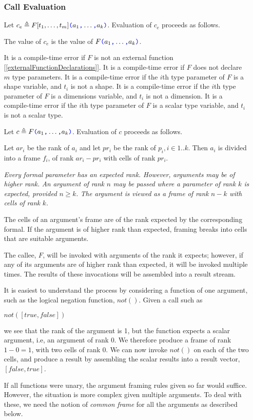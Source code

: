 \documentclass{article}
\begin{document}
\subsubsection{Call Evaluation}
\label{callEvaluation}

Let $c_e \triangleq F[t_1, \ldots, t_m]\texttt{\color{blue} (}{}a_1\texttt{\color{blue} ,}{} \ldots\texttt{\color{blue} ,}{} a_k\texttt{\color{blue} )}$. Evaluation of $c_e$ proceeds as follows. 

The value of $c_e$ is the value of $F\texttt{\color{blue} (}{}a_1\texttt{\color{blue} ,}{} \ldots\texttt{\color{blue} ,}{} a_k\texttt{\color{blue} )}$.

It is a compile-time error if $F$ is not an external function [\ref{externalFunctionDeclarations}].
It is a compile-time error if $F$ does not declare $m$ type parameters. 
It is a compile-time error if the $i$th type parameter of $F$ is a shape variable, and $t_i$ is not a shape.
It is a compile-time error if the $i$th type parameter of $F$ is a dimensions variable, and $t_i$ is not a dimension.
It is a compile-time error if the $i$th type parameter of $F$ is a scalar type variable, and $t_i$ is not a scalar type.


Let $c \triangleq F\texttt{\color{blue} (}{}a_1\texttt{\color{blue} ,}{} \ldots\texttt{\color{blue} ,}{} a_k\texttt{\color{blue} )}$. Evaluation of $c$ proceeds as follows. 

Let $ar_i$ be the rank of $a_i$ and let $pr_i$ be the rank of $p_i, i \in 1.. k$. Then  $a_i$ is divided into a frame $f_i$, of rank $ar_i - pr_i$ with cells of rank $pr_i$. 

{\em
Every formal parameter has an expected rank. However, arguments may be of higher rank. An argument of rank $n$ may be passed where a parameter of rank $k$ is expected, provided $n \ge k$. The argument is viewed as a frame of rank $n-k$ with cells of rank $k$. 

The cells of an argument's frame are of the rank expected by the corresponding formal. If the argument is of higher rank than expected, framing breaks into cells that are suitable 
arguments.

The callee, $F$, will be invoked with arguments of the rank it expects; however, if any of its arguments are of higher rank than expected, it will be invoked multiple times.
The results of these invocations will be assembled into a result stream. 

It is easiest to understand the process by considering a function of one argument, such as the logical negation function, $not()$. Given a call such as

$not([true, false])$

we see that the rank of the argument is 1, but the function expects a scalar argument, i.e, an argument of rank 0. We therefore produce a frame of rank $1 - 0 = 1$, with two cells of rank $0$.  We can now invoke $not()$ on each of the two cells, and produce a result by assembling the scalar results into a result vector, $[false, true]$.

If all functions were unary, the argument framing rules given so far would suffice. However, the situation is more complex given multiple arguments.
To deal with these, we need the notion of {\em common frame} for all the arguments as described below.
}
\end{document}
